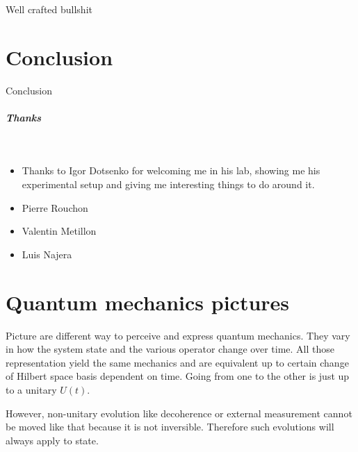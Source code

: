 \documentclass[10pt]{report}
\theoremstyle{plain}
\theoremstyle{definition}
\theoremstyle{remark}
\begin{document}
Well crafted bullshit

\chapter*{Conclusion} %

Conclusion



\vfill

\paragraph{\Huge Thanks}

\

\vspace{3mm}

\begin{itemize}

\item Thanks to Igor Dotsenko for welcoming me in his lab, showing me his
  experimental setup and giving me interesting things to do around it.
\item Pierre Rouchon
\item Valentin Metillon
\item Luis Najera

\end{itemize}

\vfill






{\let\clearpage\relax }


\appendix

\chapter{Quantum mechanics pictures}\label{app:pict}

Picture are different way to perceive and express quantum mechanics. They vary
in how the system state and the various operator change over time. All those
representation yield the same mechanics and are equivalent up to certain change
of Hilbert space basis dependent on time. Going from one to the other is just up
to a unitary $U(t)$.

However, non-unitary evolution like decoherence or external measurement
cannot be moved like that because it is not inversible. Therefore such
evolutions will always apply to state.
\end{document}
